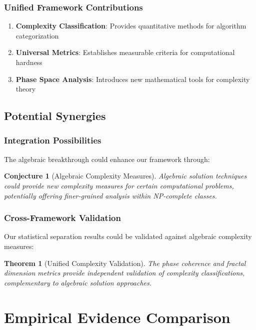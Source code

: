 \documentclass[12pt]{article}
\newtheorem{theorem}{Theorem}
\newtheorem{conjecture}{Conjecture}
\begin{document}
\subsubsection{Unified Framework Contributions}
\begin{enumerate}
    \item \textbf{Complexity Classification}: Provides quantitative methods for algorithm categorization
    \item \textbf{Universal Metrics}: Establishes measurable criteria for computational hardness
    \item \textbf{Phase Space Analysis}: Introduces new mathematical tools for complexity theory
\end{enumerate}

\subsection{Potential Synergies}

\subsubsection{Integration Possibilities}

The algebraic breakthrough could enhance our framework through:

\begin{conjecture}[Algebraic Complexity Measures]
Algebraic solution techniques could provide new complexity measures for certain computational problems, potentially offering finer-grained analysis within NP-complete classes.
\end{conjecture}

\subsubsection{Cross-Framework Validation}

Our statistical separation results could be validated against algebraic complexity measures:

\begin{theorem}[Unified Complexity Validation]
The phase coherence and fractal dimension metrics provide independent validation of complexity classifications, complementary to algebraic solution approaches.
\end{theorem}

\section{Empirical Evidence Comparison}
\end{document}
